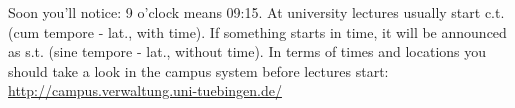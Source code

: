 
Soon you'll notice: 9 o'clock means 09:15. At university lectures usually start c.t. (cum
tempore - lat., with time). If something starts \glqq in time\grqq, it will be announced as s.t. (sine tempore - lat., without
time). In terms of times and locations you should take a look in the campus system before lectures start:\\
\url{http://campus.verwaltung.uni-tuebingen.de/}

